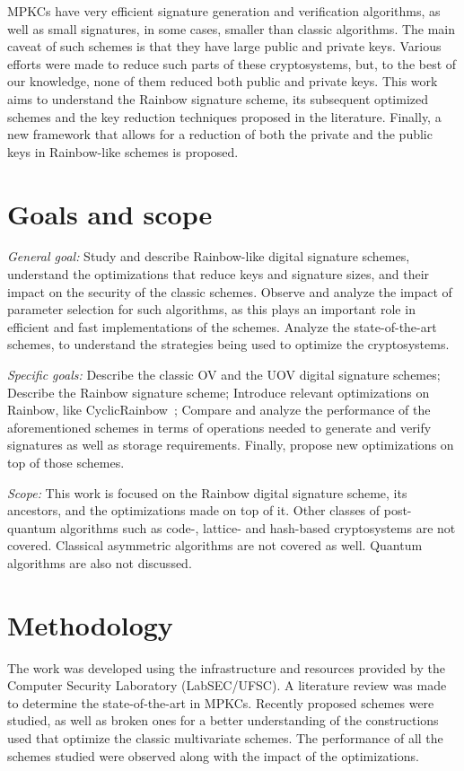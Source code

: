 \documentclass{ufsctex/ufsctex}
\begin{document}
MPKCs have very efficient signature generation and verification algorithms, as
well as small signatures, in some cases, smaller than classic algorithms. The
main caveat of such schemes is that they have large public and private keys.
Various efforts were made to reduce such parts of these cryptosystems, but, to
the best of our knowledge, none of them reduced both public and private keys.
This work aims to understand the Rainbow signature scheme, its subsequent
optimized schemes and the key reduction techniques proposed in the literature.
Finally, a new framework that allows for a reduction of both the private and
the public keys in Rainbow-like schemes is proposed.

\section{Goals and scope}

\textit{General goal:} Study and describe Rainbow-like digital signature
schemes, understand the optimizations that reduce keys and signature sizes, and
their impact on the security of the classic schemes. Observe and analyze the
impact of parameter selection for such algorithms, as this plays an important
role in efficient and fast implementations of the schemes. Analyze the
state-of-the-art schemes, to understand the strategies being used to optimize
the cryptosystems.

\textit{Specific goals:} Describe the classic OV and the UOV digital signature
schemes; Describe the Rainbow signature scheme; Introduce relevant
optimizations on Rainbow, like CyclicRainbow~\cite{petzoldt2010cyclicrainbow};
Compare and analyze the performance of the aforementioned schemes in terms of
operations needed to generate and verify signatures as well as storage
requirements. Finally, propose new optimizations on top of those schemes.

\textit{Scope:} This work is focused on the Rainbow digital signature scheme,
its ancestors, and the optimizations made on top of it. Other classes of
post-quantum algorithms such as code-, lattice- and hash-based cryptosystems
are not covered. Classical asymmetric algorithms are not covered as well.
Quantum algorithms are also not discussed.

\section{Methodology}

The work was developed using the infrastructure and resources provided by the
Computer Security Laboratory (LabSEC/UFSC). A literature review was made to
determine the state-of-the-art in MPKCs. Recently proposed schemes were
studied, as well as broken ones for a better understanding of the constructions
used that optimize the classic multivariate schemes. The performance of all the
schemes studied were observed along with the impact of the optimizations.
\end{document}
